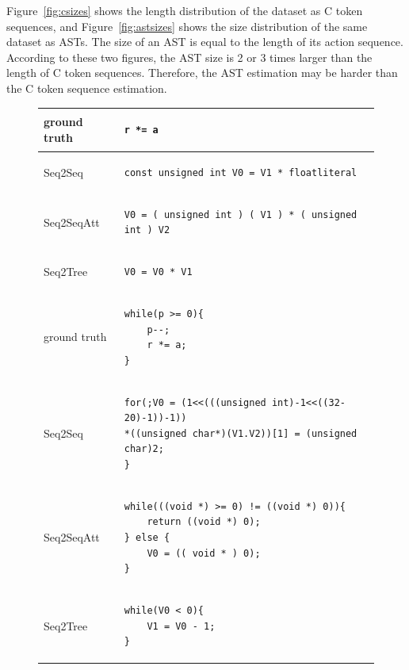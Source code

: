 \documentclass[11pt]{jarticle}
\begin{document}
Figure~\ref{fig:csizes} shows the length distribution of the dataset as C token sequences, 
and Figure~\ref{fig:astsizes} shows the size distribution of the same dataset as ASTs.
The size of an AST is equal to the length of its action sequence.
According to these two figures, the AST size is 2 or 3 times larger than the length of C token sequences.
Therefore, the AST estimation may be harder than the C token sequence estimation.

\begin{figure}
	\begin{tabular}{|l|l|} \hline
	 ground truth & 
		\begin{lstlisting}[style=Csample]
r *= a
		\end{lstlisting} \\ \hline
		Seq2Seq & 
		\begin{lstlisting}[style=Csample]
const unsigned int V0 = V1 * floatliteral
		\end{lstlisting} \\ \hline
		Seq2SeqAtt & 
		\begin{lstlisting}[style=Csample]
V0 = ( unsigned int ) ( V1 ) * ( unsigned int ) V2
		\end{lstlisting} \\ \hline
		Seq2Tree & 
		\begin{lstlisting}[style=Csample]
V0 = V0 * V1
		\end{lstlisting} \\ \hline
		\hline	
	 ground truth & 
		\begin{lstlisting}[style=Csample]
while(p >= 0){
	p--;
	r *= a;
}
		\end{lstlisting} \\ \hline
		Seq2Seq & 
		\begin{lstlisting}[style=Csample]
for(;V0 = (1<<(((unsigned int)-1<<((32-20)-1))-1))
*((unsigned char*)(V1.V2))[1] = (unsigned char)2;
}
		\end{lstlisting} \\ \hline
		Seq2SeqAtt & 
		\begin{lstlisting}[style=Csample]
while(((void *) >= 0) != ((void *) 0)){ 
	return ((void *) 0);
} else { 
	V0 = (( void * ) 0); 
}
		\end{lstlisting} \\ \hline
		Seq2Tree & 
		\begin{lstlisting}[style=Csample]
while(V0 < 0){ 
	V1 = V0 - 1;
}
		\end{lstlisting}
		 \\ \hline	\hline

\end{tabular}
\end{figure}
\end{document}
